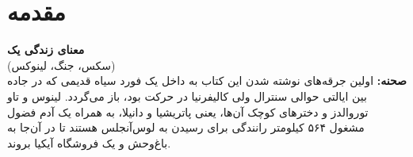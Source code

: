 \chapter{مقدمه}
\textbf{\Large معنای زندگی یک} \vspace*{10pt} \\
{\Large (سکس، جنگ، لینوکس)} \vspace*{10pt} \\

\noindent
\textbf{صحنه:} اولین جرقه‌های نوشته شدن این کتاب به داخل یک فورد سیاه
قدیمی که در جاده بین ایالتی حوالی سنترال ولی کالیفرنیا در حرکت بود،
باز می‌گردد. لینوس و تاو توروالدز و دخترهای کوچک آن‌ها، یعنی پاتریشیا و
دانیلا، به همراه یک آدم فضول مشغول ۵۶۴ کیلومتر رانندگی برای رسیدن به
لوس‌آنجلس هستند تا در آن‌جا به باغ‌وحش و یک فروشگاه
آیکیا بروند.

